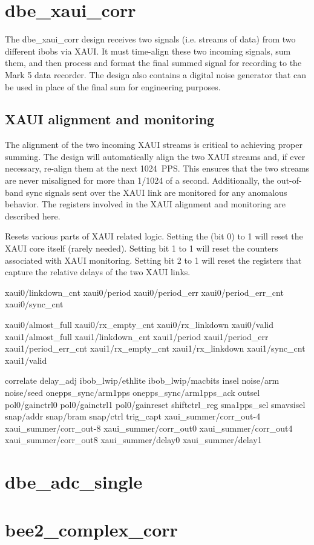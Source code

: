 \documentclass[12pt]{article}
\begin{document}
\section{dbe\_xaui\_corr}

The dbe\_xaui\_corr design receives two signals (i.e. streams of data) from two
different ibobs via XAUI.  It must time-align these two incoming signals, sum
them, and then process and format the final summed signal for recording to the
Mark 5 data recorder.  The design also contains a digital noise generator that
can be used in place of the final sum for engineering purposes.

\subsection{XAUI alignment and monitoring}

The alignment of the two incoming XAUI streams is critical to achieving proper
summing.  The design will automatically align the two XAUI streams and, if ever
necessary, re-align them at the next 1024~PPS.  This ensures that the two
streams are never misaligned for more than 1/1024 of a second.  Additionally,
the out-of-band sync signals sent over the XAUI link are monitored for any
anomalous behavior.  The registers involved in the XAUI alignment and
monitoring are described here.

\begin{description}
  Resets various parts of XAUI related logic.  Setting the
\LSb (bit 0) to 1 will reset the XAUI core itself (rarely needed).  Setting bit
1 to 1 will reset the counters associated with XAUI monitoring.  Setting bit 2
to 1 will reset the registers that capture the relative delays of the two XAUI
links.
\end{description}

xaui0/linkdown\_cnt
xaui0/period
xaui0/period\_err
xaui0/period\_err\_cnt
xaui0/sync\_cnt

xaui0/almost\_full
xaui0/rx\_empty\_cnt
xaui0/rx\_linkdown
xaui0/valid
xaui1/almost\_full
xaui1/linkdown\_cnt
xaui1/period
xaui1/period\_err
xaui1/period\_err\_cnt
xaui1/rx\_empty\_cnt
xaui1/rx\_linkdown
xaui1/sync\_cnt
xaui1/valid

correlate
delay\_adj
ibob\_lwip/ethlite
ibob\_lwip/macbits
insel
noise/arm
noise/seed
onepps\_sync/arm1pps
onepps\_sync/arm1pps\_ack
outsel
pol0/gainctrl0
pol0/gainctrl1
pol0/gainreset
shiftctrl\_reg
sma1pps\_sel
smavsisel
snap/addr
snap/bram
snap/ctrl
trig\_capt
xaui\_summer/corr\_out-4
xaui\_summer/corr\_out-8
xaui\_summer/corr\_out0
xaui\_summer/corr\_out4
xaui\_summer/corr\_out8
xaui\_summer/delay0
xaui\_summer/delay1


\section{dbe\_adc\_single}

\section{bee2\_complex\_corr}
\end{document}
